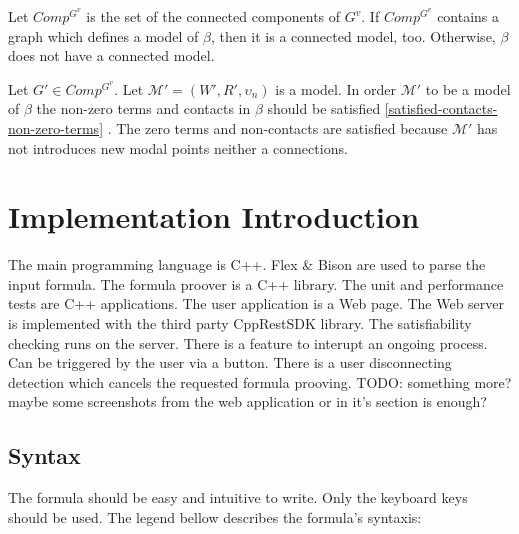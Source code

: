 \documentclass{article}
\newcommand\M{\mathcal{M}}
\begin{document}
		Let $Comp^{G^v}$ is the set of the connected components of $G^v$. If $Comp^{G^v}$ contains a graph which defines a model of $\beta$, then it is a connected model, too. Otherwise, $\beta$ does not have a connected model.

		Let $G' \in Comp^{G^v}$. Let $\M' = (W', R', \upsilon_n)$ is a model. In order $\M'$ to be a model of $\beta$ the non-zero terms and contacts in $\beta$ should be satisfied \ref{satisfied-contacts-non-zero-terms} . The zero terms and non-contacts are satisfied because $\M'$ has not introduces new modal points neither a connections.

	\newpage
	\section{Implementation Introduction}
	The main programming language is C++. Flex \& Bison are used to parse the input formula. The formula proover is a C++ library. The unit and performance tests are C++ applications.
	The user application is a Web page. The Web server is implemented with the third party CppRestSDK library. The satisfiability checking runs on the server. There is a feature to interupt an ongoing process. Can be triggered by the user via a button. There is a user disconnecting detection which cancels the requested formula prooving.
	TODO: something more? maybe some screenshots from the web application or in it's section is enough?
		
	\subsection{Syntax}
	The formula should be easy and intuitive to write. Only the keyboard keys should be used. The legend bellow describes the formula's syntaxis:
\end{document}
